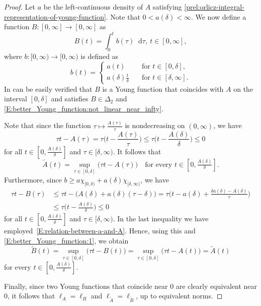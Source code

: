 \documentclass[nointlimits]{amsart}
\numberwithin{equation}{section}
\theoremstyle{plain}
\theoremstyle{definition}
\newcommand{\DTwo}{\Delta_2}
\newcommand{\tA}{\tilde{A}}
\newcommand{\lA}{\ell_A}
\newcommand*\dd{\mathop{}\!\mathrm{d}}
\begin{document}
\begin{proof}
    Let $a$ be the left-continuous density of $A$ satisfying \eqref{prel:orlicz-integral-representation-of-young-function}. Note that $0<a(\delta)<\infty$. We now define a function $B\colon[0,\infty]\to[0,\infty]$ as
\begin{equation*}
    B(t) = \int_0^t b(\tau) \dd\tau,\ t\in[0, \infty],
\end{equation*}
where $b\colon[0,\infty) \to [0, \infty)$ is defined as
\begin{equation*}
    b(t) = \begin{cases}
    a(t) \quad &\text{for $t\in[0, \delta]$},\\
    a(\delta)\frac{t}{\delta} \quad &\text{for $t\in[\delta, \infty]$}.
    \end{cases}
\end{equation*}
In can be easily verified that $B$ is a Young function that coincides with $A$ on the interval $[0, \delta]$ and satisfies $B\in\DTwo$ and \eqref{E:better_Young_function:not_linear_near_infty}.

Note that since the function $\tau\mapsto \frac{A(\tau)}{\tau}$ is nondecreasing on $(0,\infty)$, we have 
\begin{equation*}
    \tau t - A(\tau) = \tau\Bigg( t - \frac{A(\tau)}{\tau} \Bigg) \leq \tau\Bigg( t - \frac{A(\delta)}{\delta} \Bigg) \leq 0
\end{equation*}
for all $t\in[0,\frac{A(\delta)}{\delta}]$ and $\tau\in[\delta, \infty)$. It follows that
\begin{equation}\label{E:better_Young_function:1}
    \tA(t) = \sup_{\tau\in[0,\delta]} \big( \tau t - A(\tau) \big) \quad \text{for every $t\in[0,\tfrac{A(\delta)}{\delta}]$}.
\end{equation}
Furthermore, since $b \geq a\chi_{[0,\delta)} + a(\delta)\chi_{[\delta, \infty)}$, we have
\begin{align*}
    \tau t - B(\tau) &\leq \tau t - \big( A(\delta) + a(\delta)(\tau - \delta) \big) = \tau\Bigg(t - a(\delta) + \frac{ \delta a(\delta) - A(\delta)}{\tau} \Bigg) \\
    &\leq \tau \Bigg( t - \frac{A(\delta)}{\delta} \Bigg) \leq 0
\end{align*}
for all $t\in[0,\frac{A(\delta)}{\delta}]$ and $\tau\in[\delta, \infty)$. In the last inequality we have employed~\eqref{E:relation-between-a-and-A}.
Hence, using this and \eqref{E:better_Young_function:1}, we obtain
\begin{equation*}
    \tilde{B}(t) = \sup_{\tau\in[0,\delta]}\big( \tau t - B(t) \big) = \sup_{\tau\in[0,\delta]}\big( \tau t - A(t) \big) = \tilde{A}(t)
\end{equation*}
for every $t\in[0, \frac{A(\delta)}{\delta}]$.

Finally, since two Young functions that coincide near $0$ are clearly equivalent near $0$, it follows that $\lA = \ell_B$ and $\ell_{\tA} = \ell_{\tilde{B}}$, up to equivalent norms.
\end{proof}
\end{document}
